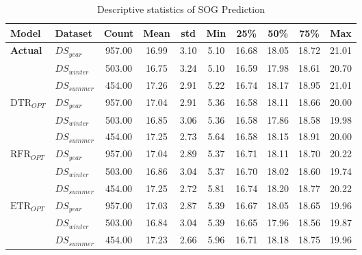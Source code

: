 \begin{table}[h]
    \footnotesize
    \centering
    {\begin{tabular}{ l l c c c c c c c c }
    \hline
    Model & Dataset & Count & Mean & std & Min & 25\% & 50\% & 75\% & Max \\
    \hline
    \textbf{{Actual}} & $DS_{year}$ & 957.00 &  16.99 &   3.10 & 5.10 &  16.68 &  18.05 &  18.72 &  21.01 \\
    & $DS_{winter}$ & 503.00 &  16.75 &   3.24 & 5.10 &  16.59 &  17.98 &  18.61 &  20.70 \\
    & $DS_{summer}$ & 454.00 &  17.26 &   2.91 & 5.22 &  16.74 &  18.17 &  18.95 &  21.01 \\
    $\text{DTR}_{OPT}$ & $DS_{year}$ & 957.00 &  17.04 &   2.91 & 5.36 &  16.58 &  18.11 &  18.66 &  20.00 \\
    & $DS_{winter}$ & 503.00 &  16.85 &   3.06 & 5.36 &  16.58 &  17.86 &  18.58 &  19.98 \\
    & $DS_{summer}$ & 454.00 &  17.25 &   2.73 & 5.64 &  16.58 &  18.15 &  18.91 &  20.00 \\
    $\text{RFR}_{OPT}$ & $DS_{year}$ & 957.00 &  17.04 &   2.89 & 5.37 &  16.71 &  18.11 &  18.70 &  20.22 \\
    & $DS_{winter}$ & 503.00 &  16.86 &   3.04 & 5.37 &  16.70 &  18.02 &  18.60 &  19.74 \\
    & $DS_{summer}$ & 454.00 &  17.25 &   2.72 & 5.81 &  16.74 &  18.20 &  18.77 &  20.22 \\
    $\text{ETR}_{OPT}$ & $DS_{year}$ & 957.00 &  17.03 &   2.87 & 5.39 &  16.67 &  18.05 &  18.65 &  19.96 \\
    & $DS_{winter}$ & 503.00 &  16.84 &   3.04 & 5.39 &  16.65 &  17.96 &  18.56 &  19.87 \\
    & $DS_{summer}$ & 454.00 &  17.23 &   2.66 & 5.96 &  16.71 &  18.18 &  18.75 &  19.96 \\
    \hline
    \end{tabular}}
\caption{Descriptive statistics of SOG Prediction}\label{tbl:SOG_pred_descriptive}
\end{table}



